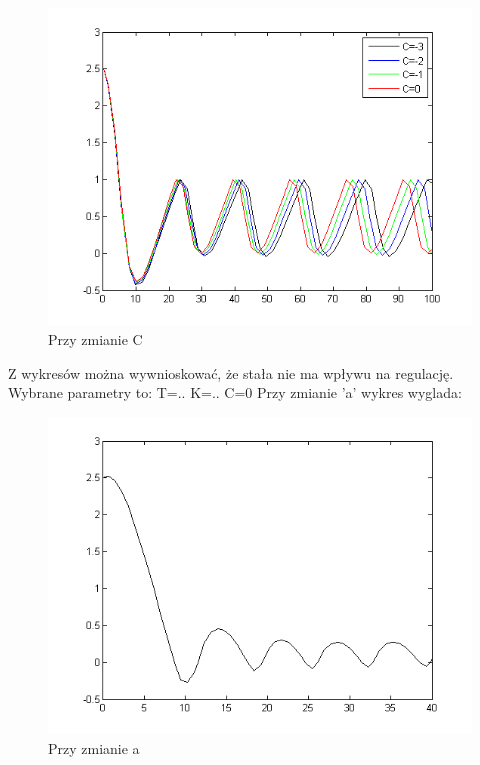 \documentclass[a4paper,10pt]{article}
\begin{document}
\begin{enumerate}
\begin{figure}[!h]
    \centering
	\includegraphics[width=120mm]{CW3-korekcja-trojpolozeniowy-e_C.png}
	\caption{Przy zmianie C}
    \label{fig:Rysunek}
\end{figure}
Z wykresów można wywnioskować, że stała nie ma wpływu na regulację.
\newline
Wybrane parametry to:
T=..
K=..
C=0
\newpage
Przy zmianie 'a' wykres wyglada:
\begin{figure}[!h]
    \centering
	\includegraphics[width=120mm]{CW3-korekcja-trojpolozeniowyBH-e_a.png}
	\caption{Przy zmianie a}
    \label{fig:Rysunek}
\end{figure}


\end{enumerate}
\end{document}

